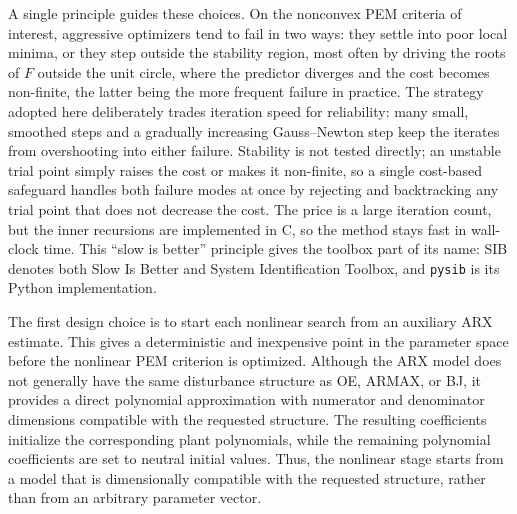 \documentclass{ifacconf}
\begin{document}
A single principle guides these choices.  On the nonconvex PEM criteria of
interest, aggressive optimizers tend to fail in two ways: they settle into poor
local minima, or they step outside the stability region, most often by driving
the roots of \(F\) outside the unit circle, where the predictor diverges and the
cost becomes non-finite, the latter being the more frequent failure in practice.
The strategy adopted here deliberately trades iteration speed for reliability:
many small, smoothed steps and a gradually increasing Gauss--Newton step keep the
iterates from overshooting into either failure.  Stability is not tested
directly; an unstable trial point simply raises the cost or makes it non-finite,
so a single cost-based safeguard handles both failure modes at once by rejecting
and backtracking any trial point that does not decrease the cost.  The price
is a large iteration count, but the inner recursions are implemented in C, so the
method stays fast in wall-clock time.  This ``slow is better'' principle gives the
toolbox part of its name: SIB denotes both Slow Is Better and System
Identification Toolbox, and \texttt{pysib} is its Python implementation.

The first design choice is to start each nonlinear search from an auxiliary ARX
estimate.  This gives a deterministic and inexpensive point in the parameter
space before the nonlinear PEM criterion is optimized.  Although the ARX model
does not generally have the same disturbance structure as OE, ARMAX, or BJ, it
provides a direct polynomial approximation with numerator and denominator
dimensions compatible with the requested structure.  The resulting coefficients
initialize the corresponding plant polynomials, while the remaining polynomial
coefficients are set to neutral initial values.  Thus, the nonlinear stage
starts from a model that is dimensionally compatible with the requested
structure, rather than from an arbitrary parameter vector.
\end{document}

